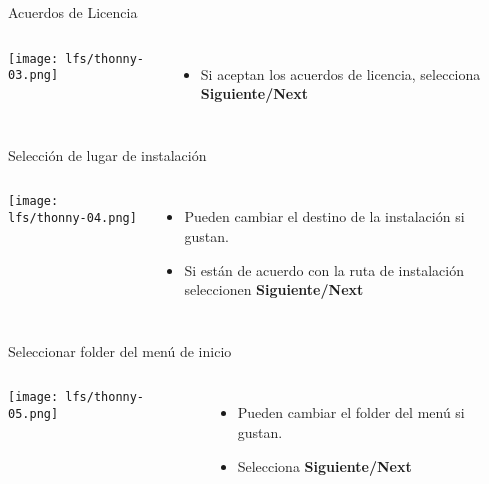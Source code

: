 \begin{frame}[c]{Acuerdos de Licencia}
    \begin{columns}
        \begin{center}
            \texttt{[image: lfs/thonny-03.png]}
        \end{center}
        \begin{itemize}
          \item Si aceptan los acuerdos de licencia, selecciona
            \textbf{Siguiente/Next}
        \end{itemize}
    \end{columns}
\end{frame}

\begin{frame}[c]{Selección de lugar de instalación}
    \begin{columns}
        \begin{center}
            \texttt{[image: lfs/thonny-04.png]}
        \end{center}
        \begin{itemize}
          \item Pueden cambiar el destino de la instalación si gustan.
          \item Si están de acuerdo con la ruta de instalación seleccionen
            \textbf{Siguiente/Next}
        \end{itemize}
    \end{columns}
\end{frame}

\begin{frame}[c]{Seleccionar folder del menú de inicio}
    \begin{columns}
        \begin{center}
            \texttt{[image: lfs/thonny-05.png]}
        \end{center}
        \begin{itemize}
          \item Pueden cambiar el folder del menú si gustan.
          \item Selecciona \textbf{Siguiente/Next}
        \end{itemize}
    \end{columns}
\end{frame}

